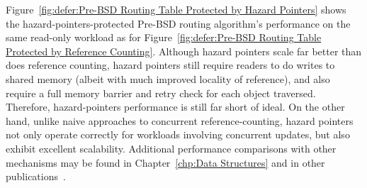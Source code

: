 Figure~\ref{fig:defer:Pre-BSD Routing Table Protected by Hazard Pointers}
shows the hazard-pointers-protected Pre-BSD routing algorithm's
performance on the same read-only workload as for
Figure~\ref{fig:defer:Pre-BSD Routing Table Protected by Reference Counting}.
Although hazard pointers scale far better than does reference counting,
hazard pointers still require readers to do writes to shared
memory (albeit with much improved locality of reference),
and also require a full memory barrier and retry check for each
object traversed.
Therefore, hazard-pointers performance is still far short of ideal.
On the other hand, unlike naive approaches to concurrent
reference-counting, hazard pointers not only operate correctly for
workloads involving concurrent updates, but also exhibit excellent
scalability.
Additional performance comparisons with other mechanisms may be found in
Chapter~\ref{chp:Data Structures}
and in other publications~\cite{ThomasEHart2007a,McKenney:2013:SDS:2483852.2483867,MagedMichael04a}.

